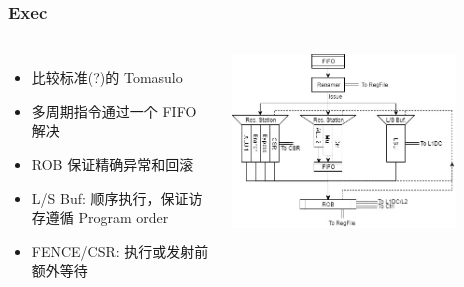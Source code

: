 \documentclass[UTF-8]{ctexbeamer}
\begin{document}
\begin{frame}
  \frametitle{Exec}

  \begin{columns}
    \begin{itemize}
      \item 比较标准(?)的 Tomasulo
      \item 多周期指令通过一个 FIFO 解决
      \item ROB 保证精确异常和回滚
      \item L/S Buf: 顺序执行，保证访存遵循 Program order
      \item FENCE/CSR: 执行或发射前额外等待
    \end{itemize}
    \begin{center}
      \includegraphics[width=0.8\textwidth]{assets/exec.jpg}
    \end{center}
  \end{columns}
\end{frame}
\end{document}
